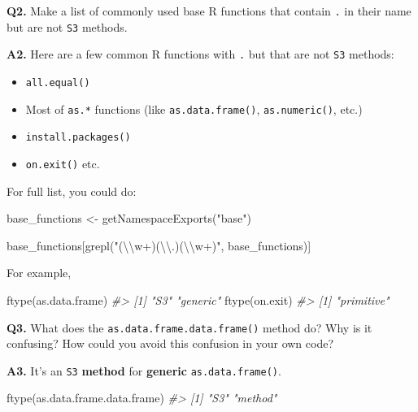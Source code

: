 \documentclass[
]{book}
\newenvironment{Shaded}{\begin{snugshade}}{\end{snugshade}}
\newcommand{\CommentTok}[1]{\textcolor[rgb]{0.56,0.35,0.01}{\textit{#1}}}
\newcommand{\FunctionTok}[1]{\textcolor[rgb]{0.00,0.00,0.00}{#1}}
\newcommand{\NormalTok}[1]{#1}
\newcommand{\OtherTok}[1]{\textcolor[rgb]{0.56,0.35,0.01}{#1}}
\newcommand{\SpecialCharTok}[1]{\textcolor[rgb]{0.00,0.00,0.00}{#1}}
\newcommand{\StringTok}[1]{\textcolor[rgb]{0.31,0.60,0.02}{#1}}
\providecommand{\tightlist}{%
  \setlength{\itemsep}{0pt}\setlength{\parskip}{0pt}}
\begin{document}
\textbf{Q2.} Make a list of commonly used base R functions that contain \texttt{.} in their name but are not \texttt{S3} methods.

\textbf{A2.} Here are a few common R functions with \texttt{.} but that are not \texttt{S3} methods:

\begin{itemize}
\tightlist
\item
  \texttt{all.equal()}
\item
  Most of \texttt{as.*} functions (like \texttt{as.data.frame()}, \texttt{as.numeric()}, etc.)
\item
  \texttt{install.packages()}
\item
  \texttt{on.exit()}
  etc.
\end{itemize}

For full list, you could do:

\begin{Shaded}
\begin{Highlighting}[]
\NormalTok{base\_functions }\OtherTok{\textless{}{-}} \FunctionTok{getNamespaceExports}\NormalTok{(}\StringTok{"base"}\NormalTok{)}

\NormalTok{base\_functions[}\FunctionTok{grepl}\NormalTok{(}\StringTok{"(}\SpecialCharTok{\textbackslash{}\textbackslash{}}\StringTok{w+)(}\SpecialCharTok{\textbackslash{}\textbackslash{}}\StringTok{.)(}\SpecialCharTok{\textbackslash{}\textbackslash{}}\StringTok{w+)"}\NormalTok{, base\_functions)]}
\end{Highlighting}
\end{Shaded}

For example,

\begin{Shaded}
\begin{Highlighting}[]
\FunctionTok{ftype}\NormalTok{(as.data.frame)}
\CommentTok{\#\textgreater{} [1] "S3"      "generic"}
\FunctionTok{ftype}\NormalTok{(on.exit)}
\CommentTok{\#\textgreater{} [1] "primitive"}
\end{Highlighting}
\end{Shaded}

\textbf{Q3.} What does the \texttt{as.data.frame.data.frame()} method do? Why is it confusing? How could you avoid this confusion in your own code?

\textbf{A3.} It's an \texttt{S3} \textbf{method} for \textbf{generic} \texttt{as.data.frame()}.

\begin{Shaded}
\begin{Highlighting}[]
\FunctionTok{ftype}\NormalTok{(as.data.frame.data.frame)}
\CommentTok{\#\textgreater{} [1] "S3"     "method"}
\end{Highlighting}
\end{Shaded}
\end{document}
